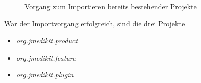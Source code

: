 \begin{figure}[H]
\centering
{}
\caption{Vorgang zum Importieren bereits bestehender Projekte}
\label{import}
\end{figure}

War der Importvorgang erfolgreich, sind die drei Projekte 

\begin{itemize}
\item \textit{org.jmedikit.product}
\item \textit{org.jmedikit.feature}
\item  \textit{org.jmedikit.plugin} 
\end{itemize}

